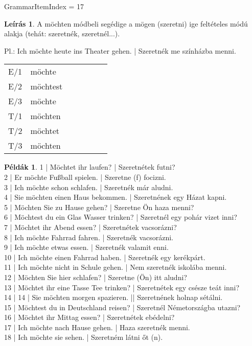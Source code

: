 \documentclass{article}
\theoremstyle{definition}
\newtheorem*{exmp}{Példák}
\newtheorem*{desc}{Leírás}
\begin{document}
GrammarItemIndex = 17

\begin{desc}
A möchten módbeli segédige a mögen (szeretni) ige feltételes módú
alakja (tehát: szeretnék, szeretnél...).

Pl.: Ich möchte heute ins Theater gehen. | Szeretnék me színházba menni.

\begin{tabular}{lllllll}
E/1 & möchte \\
E/2 & möchtest \\
E/3 & möchte \\
T/1 & möchten \\
T/2 & möchtet \\
T/3 & möchten \\
\end{tabular}
\end{desc}

\begin{exmp}
1 | Möchtet ihr laufen? | Szeretnétek futni?\\
2 | Er möchte Fußball spielen. | Szeretne (f) focizni.\\
3 | Ich möchte schon schlafen. | Szeretnék már aludni.\\
4 | Sie möchten einen Haus bekommen. | Szeretnének egy Házat kapni.\\
5 | Möchten Sie zu Hause gehen? | Szeretne Ön haza menni?\\
6 | Möchtest du ein Glas Wasser trinken? | Szeretnél egy pohár vizet inni?\\
7 | Möchtet ihr Abend essen? | Szeretnétek vacsorázni?\\
8 | Ich möchte Fahrrad fahren. | Szeretnék vacsorázni.\\
9 | Ich möchte etwas essen. | Szeretnék valamit enni.\\
10 | Ich möchte einen Fahrrad haben. | Szeretnék egy kerékpárt.\\
11 | Ich möchte nicht in Schule gehen. | Nem szeretnék iskolába menni.\\
12 | Möchten Sie hier schlafen? | Szeretne (Ön) itt aludni?\\
13 | Möchtet ihr eine Tasse Tee trinken? | Szeretnétek egy csésze teát inni?\\
14 | 14 | Sie möchten morgen spazieren. || Szeretnének holnap sétálni.\\
15 | Möchtest du in Deutschland reisen? | Szeretnél Németországba utazni?\\
16 | Möchtet ihr Mittag essen? | Szeretnétek ebédelni?\\
17 | Ich möchte nach Hause gehen. | Haza szeretnék menni.\\
18 | Ich möchte sie sehen. | Szeretném látni őt (n).\\
\end{exmp}
\end{document}
